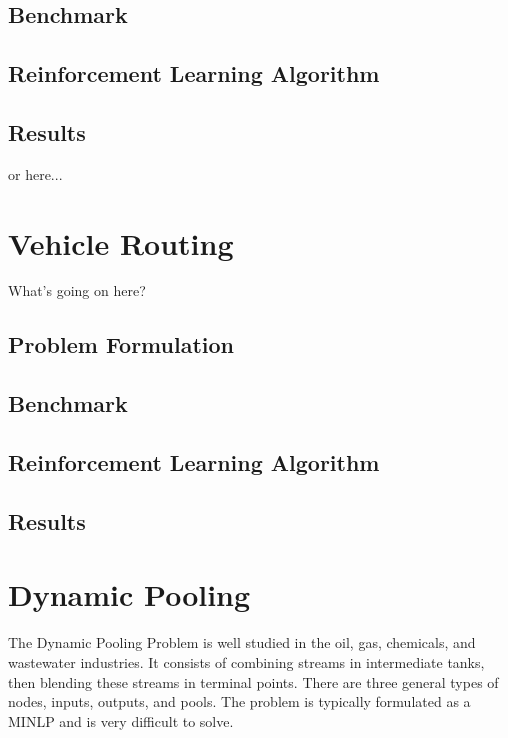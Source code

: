 \documentclass[12pt]{article}
\begin{document}
\subsection{Benchmark}

\subsection{Reinforcement Learning Algorithm}

\subsection{Results}

or here...

\section{Vehicle Routing}

What's going on here?

\subsection{Problem Formulation}

\lipsum[1]

\subsection{Benchmark}

\subsection{Reinforcement Learning Algorithm}

\subsection{Results}

\section{Dynamic Pooling}


The Dynamic Pooling Problem is well studied in the oil, gas, chemicals, and wastewater industries.
It consists of combining streams in intermediate tanks, then blending these streams in terminal points.
There are three general types of nodes, inputs, outputs, and pools.
The problem is typically formulated as a MINLP and is very difficult to solve.
\end{document}
